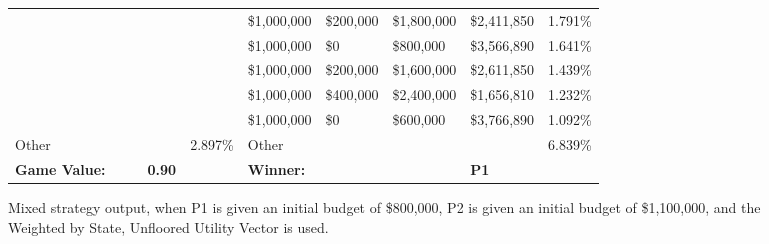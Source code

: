 \documentclass[11pt]{article}
\begin{document}
\begin{figure}
\begin{tabular}{ |p{1.0cm}p{1.0cm}p{1.0cm}p{2.0cm}|p{1.0cm}||p{1.0cm}p{1.0cm}p{1.0cm}p{2.0cm}|p{1.0cm}|}
&  &  &  &  & \$1,000,000 & \$200,000 & \$1,800,000 & \$2,411,850 & 1.791\% \\
&  &  &  &  & \$1,000,000 & \$0 & \$800,000 & \$3,566,890 & 1.641\% \\
&  &  &  &  & \$1,000,000 & \$200,000 & \$1,600,000 & \$2,611,850 & 1.439\% \\
&  &  &  &  & \$1,000,000 & \$400,000 & \$2,400,000 & \$1,656,810 & 1.232\% \\
&  &  &  &  & \$1,000,000 & \$0 & \$600,000 & \$3,766,890 & 1.092\% \\
\hline
Other &  &  &  & 2.897\% & Other &  &  &  & 6.839\% \\
\hline
\small \textbf{Game Value:} &&& \small \textbf{0.90} && \small \textbf{Winner:} &&& \small \textbf{P1}&\\
\hline
\end{tabular}
\caption{Mixed strategy output, when P1 is given an initial budget of \$800,000, P2 is given an initial budget of \$1,100,000, and the Weighted by State, Unfloored Utility Vector is used.}
\label{8v11table.5}
\end{figure}
\end{document}

